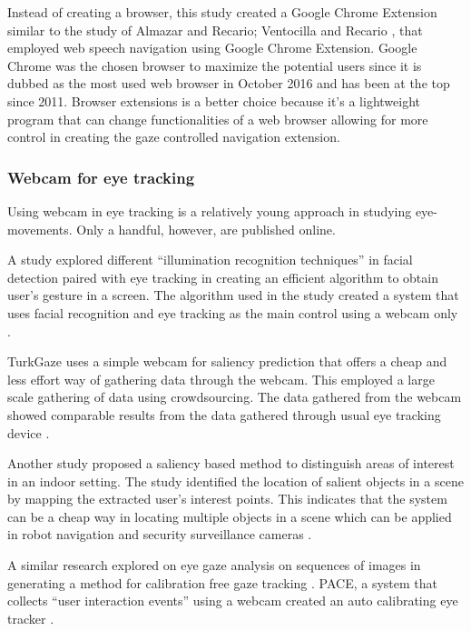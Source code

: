 \documentclass[journal]{./IEEE/IEEEtran}
\begin{document}
Instead of creating a browser, this study  created a Google Chrome Extension similar to the study of Almazar and Recario; Ventocilla and Recario  \cite {almazar_recario_2016}, \cite{ ventocilla_recario_2014 } that employed web speech navigation using Google Chrome Extension. Google Chrome was the chosen browser to maximize the potential users since it is dubbed as the most used web browser in October 2016 and has been at the top since 2011. Browser extensions is a better choice because it’s a lightweight program that can change functionalities of a web browser allowing for more control in creating the gaze controlled navigation extension.


\subsubsection{Webcam for eye tracking} \leavevmode

Using webcam in eye tracking is a relatively young approach in studying eye-movements. Only a handful, however,  are published online. 

A study explored different “illumination recognition techniques” in facial detection paired with eye tracking in creating an efficient algorithm to obtain user’s gesture in a screen. The algorithm used in the study created a system that uses facial recognition and eye tracking as the main control using a webcam only \cite {lin_chao_lin_chen_2005}.

TurkGaze uses a simple webcam for saliency prediction that offers a cheap and less effort way of gathering data through the webcam. This employed a large scale gathering of data using crowdsourcing. The data gathered from the webcam showed comparable results from the data gathered through usual eye tracking device \cite { guillotel_nguyen_chamaret_fleureau_2013}. 

Another study proposed a saliency based method to distinguish areas of interest in an indoor setting. The study identified the location of salient objects in a scene by mapping the extracted user’s interest points. This indicates that the system can be a cheap way in locating multiple objects in a scene which can be applied in robot navigation and security surveillance cameras \cite{rudinac_jonker}.

A similar research explored on eye gaze analysis on sequences of images in generating a method for calibration free gaze tracking  \cite { guillotel_nguyen_chamaret_fleureau_2013}. PACE, a system that collects “user interaction events” using a webcam created an auto calibrating eye tracker  \cite { huang_kwok_ngai_chan_leong_2016}. 
\end{document}
